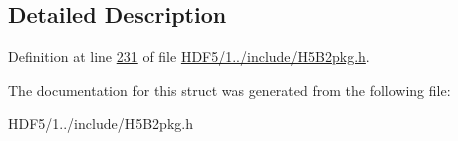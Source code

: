 \subsection{Detailed Description}


Definition at line \hyperlink{_h_d_f5_21_810_81_2include_2_h5_b2pkg_8h_source_l00231}{231} of file \hyperlink{_h_d_f5_21_810_81_2include_2_h5_b2pkg_8h_source}{H\+D\+F5/1../include/\+H5\+B2pkg.\+h}.



The documentation for this struct was generated from the following file\+:\begin{DoxyCompactItemize}
\item 
H\+D\+F5/1../include/\+H5\+B2pkg.\+h\end{DoxyCompactItemize}
